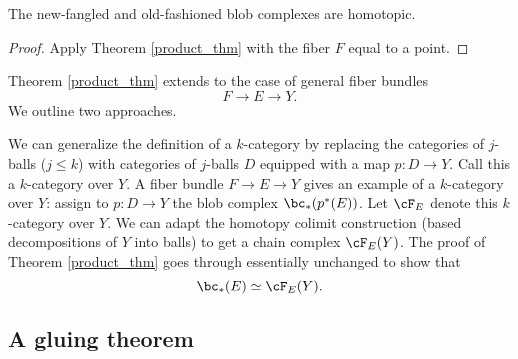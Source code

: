
\medskip

\begin{cor}
\label{cor:new-old}
The new-fangled and old-fashioned blob complexes are homotopic.
\end{cor}
\begin{proof}
Apply Theorem \ref{product_thm} with the fiber $F$ equal to a point.
\end{proof}

\medskip

Theorem \ref{product_thm} extends to the case of general fiber bundles
\[
	F \to E \to Y .
\]
We outline two approaches.

We can generalize the definition of a $k$-category by replacing the categories
of $j$-balls ($j\le k$) with categories of $j$-balls $D$ equipped with a map $p:D\to Y$.
Call this a $k$-category over $Y$.
A fiber bundle $F\to E\to Y$ gives an example of a $k$-category over $Y$:
assign to $p:D\to Y$ the blob complex $\bc_*(p^*(E))$.
Let $\cF_E$ denote this $k$-category over $Y$.
We can adapt the homotopy colimit construction (based decompositions of $Y$ into balls) to
get a chain complex $\cF_E(Y)$.
The proof of Theorem \ref{product_thm} goes through essentially unchanged 
to show that
\[
	\bc_*(E) \simeq \cF_E(Y) .
\]








\subsection{A gluing theorem}
\label{sec:gluing}

